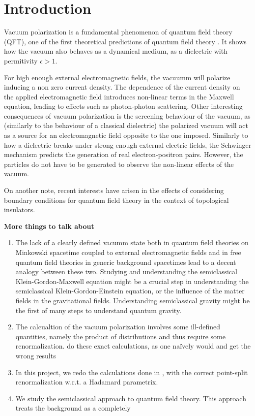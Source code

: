 \chapter{Introduction}

Vacuum polarization is a fundamental phenomenon of quantum field theory (QFT), one of the first theoretical predictions of quantum field theory \cite{Uehling1935}\cite{Heis1936}. It shows how the vacuum also behaves as a dynamical medium, as a dielectric with permitivity $\epsilon > 1$.

For high enough external electromagnetic fields, the vacuumm will polarize inducing a non zero current density. The dependence of the current density on the applied electromagnetic field introduces non-linear terms in the Maxwell equation, leading to effects such as photon-photon scattering. Other interesting consequences of vacuum polarization is the screening behaviour of the vacuum, as (similarly to the behaviour of a classical dielectric) the polarized vacuum will act as a source for an electromagnetic field opposite to the one imposed.
Similarly to how a dielectric breaks under strong enough external electric fields, the Schwinger mechanism predicts the generation of real electron-positron pairs. However, the particles do not have to be generated to observe the non-linear effects of the vacuum. 

On another note, recent interests have arisen in the effects of considering boundary conditions for quantum field theory in the context of topological insulators.

\textbf{More things to talk about}
\begin{enumerate}
	\item The lack of a clearly defined vacumm state both in quantum field theories on Minkowski spacetime coupled to external electromagnetic fields and in free quantum field theories in generic background spacetimes lead to a decent analogy between these two. Studying and understanding the semiclassical Klein-Gordon-Maxwell equation might be a crucial step in understanding the semiclassical Klein-Gordon-Einstein equation, or the influence of the matter fields in the gravitational fields. Understanding semiclassical gravity might be the first of many steps to understand quantum gravity.
	\item The calcualtion of the vacuum polarization involves some ill-defined quantities, namely the product of distributions and thus require some renormalization. \cite{Ambjorn1983} do these exact calculations, as one naïvely would and get the wrong results \cite{Wendersson2022}
	\item In this project, we redo the calculations done in \cite{Ambjorn1983}, with the correct point-split renormalization w.r.t. a Hadamard parametrix. 
	\item We study the semiclassical approach to quantum field theory. This approach treats the background as a completely 
\end{enumerate}

